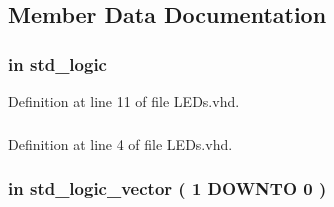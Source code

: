 \subsection{Member Data Documentation}
\hypertarget{class_l_e_ds_a4b5e1e3eba67b2e61c77c9a719d8518c}{}
\subsubsection[{C\+L\+O\+C\+K\+\_\+50}]{ {\bfseries \textcolor{keywordflow}{in}\textcolor{vhdlchar}{ }} {\bfseries \textcolor{comment}{std\+\_\+logic}\textcolor{vhdlchar}{ }} \hspace{0.3cm}{\ttfamily [Port]}}\label{class_l_e_ds_a4b5e1e3eba67b2e61c77c9a719d8518c}


Definition at line 11 of file L\+E\+Ds.\+vhd.

\hypertarget{class_l_e_ds_a0a6af6eef40212dbaf130d57ce711256}{}
\subsubsection[{ieee}]{\hspace{0.3cm}{\ttfamily [Library]}}\label{class_l_e_ds_a0a6af6eef40212dbaf130d57ce711256}


Definition at line 4 of file L\+E\+Ds.\+vhd.

\hypertarget{class_l_e_ds_aa70bf9245705f33e4529eb81df3fbf94}{}
\subsubsection[{K\+E\+Y}]{ {\bfseries \textcolor{keywordflow}{in}\textcolor{vhdlchar}{ }} {\bfseries \textcolor{comment}{std\+\_\+logic\+\_\+vector}\textcolor{vhdlchar}{ }\textcolor{vhdlchar}{(}\textcolor{vhdlchar}{ }\textcolor{vhdlchar}{ } \textcolor{vhdldigit}{1} \textcolor{vhdlchar}{ }\textcolor{keywordflow}{D\+O\+W\+N\+T\+O}\textcolor{vhdlchar}{ }\textcolor{vhdlchar}{ } \textcolor{vhdldigit}{0} \textcolor{vhdlchar}{ }\textcolor{vhdlchar}{)}\textcolor{vhdlchar}{ }} \hspace{0.3cm}{\ttfamily [Port]}}\label{class_l_e_ds_aa70bf9245705f33e4529eb81df3fbf94}



